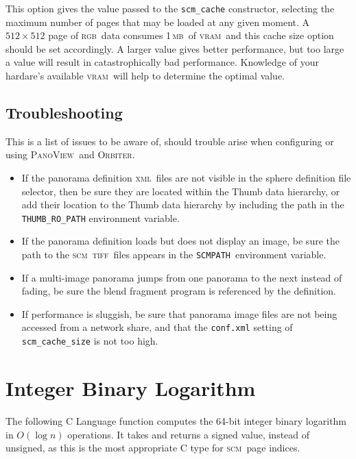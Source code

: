 \documentclass[oneside,10pt]{memoir}
\newcommand{\scm}     {\textsc{scm}}
\newcommand{\tiff}    {\textsc{tiff}}
\newcommand{\xml}     {\textsc{xml}}
\newcommand{\scmpath}{\texttt{SCMPATH}}
\newcommand{\rgb}     {\textsc{rgb}}
\newcommand{\mb}    {\,\textsc{mb}}
\newcommand{\vram}    {\textsc{vram}}
\newcommand{\panoview}{\textsc{PanoView}}
\newcommand{\orbiter} {\textsc{Orbiter}}
\begin{document}
\begin{Spacing}{1.1}
This option gives the value passed to the \texttt{scm\_cache} constructor, selecting the maximum number of pages that may be loaded at any given moment. A $512\times 512$ page of \rgb\ data consumes 1\mb\ of \vram\, and this cache size option should be set accordingly. A larger value gives better performance, but too large a value will result in catastrophically bad performance. Knowledge of your hardare's available \vram\ will help to determine the optimal value.

\section{Troubleshooting}

This is a list of issues to be aware of, should trouble arise when configuring or using \panoview\ and \orbiter.

\begin{itemize}
\item If the panorama definition \xml\ files are not visible in the sphere definition file selector, then be sure they are located within the Thumb data hierarchy, or add their location to the Thumb data hierarchy by including the path in the \verb|THUMB_RO_PATH| environment variable.

\item If the panorama definition loads but does not display an image, be sure the path to the \scm\ \tiff\ files appears in the \scmpath\ environment variable.

\item If a multi-image panorama jumps from one panorama to the next instead of fading, be sure the blend fragment program is referenced by the definition.

\item If performance is sluggish, be sure that panorama image files are not being accessed from a network share, and that the \texttt{conf.xml} setting of \verb|scm_cache_size| is not too high.
\end{itemize}



\appendix
\chapter{Integer Binary Logarithm}
\label{cha:log}

The following C Language function computes the 64-bit integer binary logarithm in $O(\log n)$ operations. It takes and returns a signed value, instead of unsigned, as this is the most appropriate C type for \scm\ page indices.


\end{Spacing}
\end{document}
